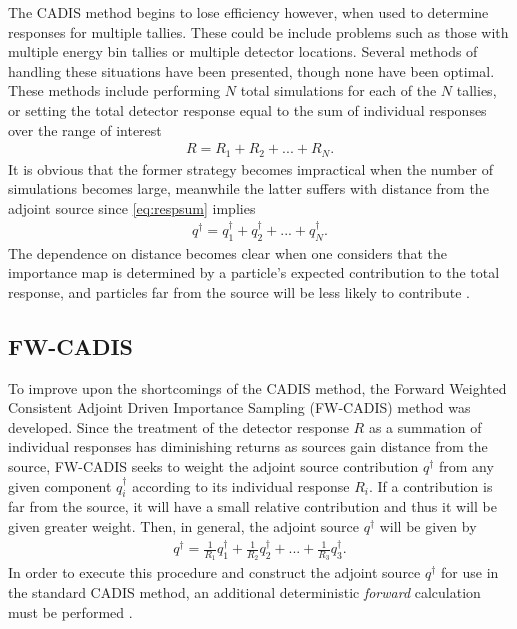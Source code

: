 \documentclass[10pt]{article}
\begin{document}
The CADIS method begins to lose efficiency however, when used to determine responses for multiple tallies. These could be include problems such as those with multiple energy bin tallies or multiple detector locations. Several methods of handling these situations have been presented, though none have been optimal. These methods include performing $N$ total simulations for each of the $N$ tallies, or setting the total detector response equal to the sum of individual responses over the range of interest \cite{software:advantg}
\begin{align}
R = R_1 + R_2 + ... + R_N.
\label{eq:respsum}
\end{align}
It is obvious that the former strategy becomes impractical when the number of simulations becomes large, meanwhile the latter suffers with distance from the adjoint source since \cref{eq:respsum} implies
\begin{align}
q^{\dagger} = q^{\dagger}_1 + q^{\dagger}_2 + ... + q^{\dagger}_N.
\label{eq:respsum}
\end{align}
The dependence on distance becomes clear when one considers that the importance map is determined by a particle's expected contribution to the total response, and particles far from the source will be less likely to contribute \cite{software:advantg}.



\subsection{FW-CADIS}
\label{sec:math:fw-cadis}

To improve upon the shortcomings of the CADIS method, the Forward Weighted Consistent Adjoint Driven Importance Sampling (FW-CADIS) method was developed. Since the treatment of the detector response $R$ as a summation of individual responses has diminishing returns as sources gain distance from the source, FW-CADIS seeks to weight the adjoint source contribution $q^\dagger$ from any given component $q^\dagger_i$ according to its individual response $R_i$. If a contribution is far from the source, it will have a small relative contribution and thus it will be given greater weight. Then, in general, the adjoint source $q^\dagger$ will be given by
\begin{align}
q^\dagger = \frac{1}{R_1}q^\dagger_1 +  \frac{1}{R_2}q^\dagger_2 + ... +  \frac{1}{R_3}q^\dagger_3.
\label{eq:respsum}
\end{align}
In order to execute this procedure and construct the adjoint source $q^\dagger$ for use in the standard CADIS method, an additional deterministic \textit{forward} calculation must be performed \cite{software:advantg}.
\end{document}
